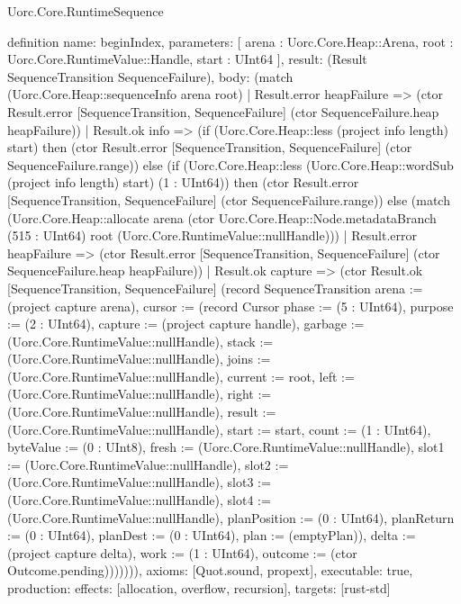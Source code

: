 \begin{lexlean}{Uorc.Core.RuntimeSequence}
\begin{semanticmodule}
definition{
  name: beginIndex,
  parameters: [
    arena : Uorc.Core.Heap::Arena,
    root : Uorc.Core.RuntimeValue::Handle,
    start : UInt64
  ],
  result: (Result SequenceTransition SequenceFailure),
  body: (match (Uorc.Core.Heap::sequenceInfo arena root)
    | Result.error heapFailure => (ctor Result.error [SequenceTransition, SequenceFailure] (ctor SequenceFailure.heap heapFailure))
    | Result.ok info => (if (Uorc.Core.Heap::less (project info length) start) then (ctor Result.error [SequenceTransition, SequenceFailure] (ctor SequenceFailure.range)) else (if (Uorc.Core.Heap::less (Uorc.Core.Heap::wordSub (project info length) start) (1 : UInt64)) then (ctor Result.error [SequenceTransition, SequenceFailure] (ctor SequenceFailure.range)) else (match (Uorc.Core.Heap::allocate arena (ctor Uorc.Core.Heap::Node.metadataBranch (515 : UInt64) root (Uorc.Core.RuntimeValue::nullHandle)))
      | Result.error heapFailure => (ctor Result.error [SequenceTransition, SequenceFailure] (ctor SequenceFailure.heap heapFailure))
      | Result.ok capture => (ctor Result.ok [SequenceTransition, SequenceFailure] (record SequenceTransition {arena := (project capture arena), cursor := (record Cursor {phase := (5 : UInt64), purpose := (2 : UInt64), capture := (project capture handle), garbage := (Uorc.Core.RuntimeValue::nullHandle), stack := (Uorc.Core.RuntimeValue::nullHandle), joins := (Uorc.Core.RuntimeValue::nullHandle), current := root, left := (Uorc.Core.RuntimeValue::nullHandle), right := (Uorc.Core.RuntimeValue::nullHandle), result := (Uorc.Core.RuntimeValue::nullHandle), start := start, count := (1 : UInt64), byteValue := (0 : UInt8), fresh := (Uorc.Core.RuntimeValue::nullHandle), slot1 := (Uorc.Core.RuntimeValue::nullHandle), slot2 := (Uorc.Core.RuntimeValue::nullHandle), slot3 := (Uorc.Core.RuntimeValue::nullHandle), slot4 := (Uorc.Core.RuntimeValue::nullHandle), planPosition := (0 : UInt64), planReturn := (0 : UInt64), planDest := (0 : UInt64), plan := (emptyPlan)}), delta := (project capture delta), work := (1 : UInt64), outcome := (ctor Outcome.pending)})))))),
  axioms: [Quot.sound, propext],
  executable: true,
  production: {effects: [allocation, overflow, recursion], targets: [rust-std]}
}


\end{semanticmodule}
\end{lexlean}
